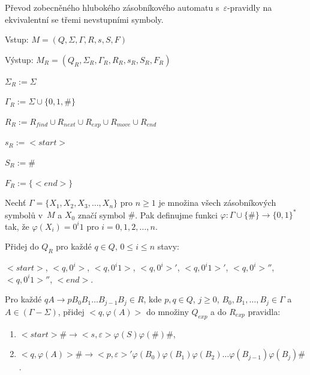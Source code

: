 \begin{Alg}\label{alg_gen_deep_pda_nonterm}
Převod zobecněného hlubokého zásobníkového automatu s~$\varepsilon$-pravidly na ekvivalentní se třemi nevstupními symboly.

\begin{list}{}{\setlength\parsep{0cm} \setlength\itemsep{0cm} \setlength\leftmargin{1em}}
   \item Vstup: $M = (Q,\Sigma,\Gamma, R, s, S, F)$ 
   \item Výstup: $M_{R} = (Q_{R}, \Sigma_{R}, {\Gamma}_{R}, R_{R}, s_{R},  S_{R}, F_{R})$ \medskip
  
   \item ${\Sigma}_{R} := \Sigma$
   \item ${\Gamma}_{R} := \Sigma \cup \{0,1,\#\}$
   \item $R_{R} := R_{find} \cup R_{next} \cup R_{exp} \cup R_{move} \cup R_{end}$
   \item $s_{R} := <start> $
   \item $S_{R} := \# $
   \item $F_{R} := \{<end>\} $ \medskip

\medskip

  \item Nechť $\Gamma = \{X_1, X_2, X_3, \dots, X_n\}$ pro $n \ge 1$ je množina všech zásobníkových symbolů v~$M$ a $X_0$ značí symbol $\#$. Pak definujme funkci $\varphi : \Gamma \cup \{\#\} \rightarrow \{0,1\}^*$ tak, že $\varphi (X_i)=0^i 1$ pro $i = 0,1,2,\dots,n$. \medskip

  \item Přidej do $Q_R$ pro každé $q \in Q$, $0 \le i \le n$ stavy:
  \item $<start>$, $<q, 0^i>$, $<q, 0^i 1>$, $<q, 0^i>'$, $<q, 0^i 1>'$, $<q, 0^i>''$, $<q, 0^i 1>''$, $<end>$.\medskip

  \item Pro každé $qA \rightarrow p B_0 B_1 \dots B_{j-1} B_{j} \in R$, kde $p, q \in Q$, $j \ge 0$, $B_0,B_1,\dots,B_j \in \Gamma$ a $A \in (\Gamma - \Sigma)$, 
          přidej $<q, \varphi (A)>$ do množiny $Q_{exp}$  a do $R_{exp}$ pravidla:

\begin{enumerate}
\renewcommand{\labelenumi}{(\roman{enumi})}

  \item $<start> \# \rightarrow <s, \varepsilon> \varphi(S)\varphi(\#)\#$,
  \item $<q, \varphi (A)> \# \rightarrow <p, \varepsilon>' \varphi(B_0)\varphi(B_1)\varphi(B_2) \dots \varphi(B_{j-1}) \varphi(B_{j}) \#$.


\end{enumerate}
\end{list}
\end{Alg}
